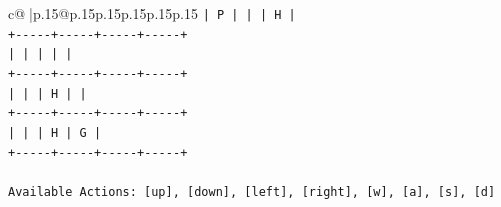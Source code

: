 \documentclass{article}
\begin{document}
{\begin{supertabular}{c@{$\;$}|p{.15\linewidth}@{}p{.15\linewidth}p{.15\linewidth}p{.15\linewidth}p{.15\linewidth}p{.15\linewidth}}
{{{\texttt{|  P  |     |     |  H  |} \\
\texttt{+{-}{-}{-}{-}{-}+{-}{-}{-}{-}{-}+{-}{-}{-}{-}{-}+{-}{-}{-}{-}{-}+} \\
\texttt{|     |     |     |     |} \\
\texttt{+{-}{-}{-}{-}{-}+{-}{-}{-}{-}{-}+{-}{-}{-}{-}{-}+{-}{-}{-}{-}{-}+} \\
\texttt{|     |     |  H  |     |} \\
\texttt{+{-}{-}{-}{-}{-}+{-}{-}{-}{-}{-}+{-}{-}{-}{-}{-}+{-}{-}{-}{-}{-}+} \\
\texttt{|     |     |  H  |  G  |} \\
\texttt{+{-}{-}{-}{-}{-}+{-}{-}{-}{-}{-}+{-}{-}{-}{-}{-}+{-}{-}{-}{-}{-}+} \\
\\ 
\texttt{Available Actions: {[}up{]}, {[}down{]}, {[}left{]}, {[}right{]}, {[}w{]}, {[}a{]}, {[}s{]}, {[}d{]}} \\
            }
        }
    }
     \\ \\


\end{supertabular}}
\end{document}

